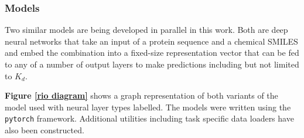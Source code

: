 \documentclass{article}
\begin{document}
\subsubsection{Models}
Two similar models are being developed in parallel in this work. Both are deep neural networks that take an input of a protein sequence and a chemical SMILES and embed the combination into a fixed-size representation vector that can be fed to any of a number of output layers to make predictions including but not limited to $K_d$.
\par 
\textbf{Figure \ref{rio diagram}} shows a graph representation of both variants of the model used with neural layer types labelled. The models were written using the \texttt{pytorch} framework. Additional utilities including task specific data loaders have also been constructed.
\end{document}
